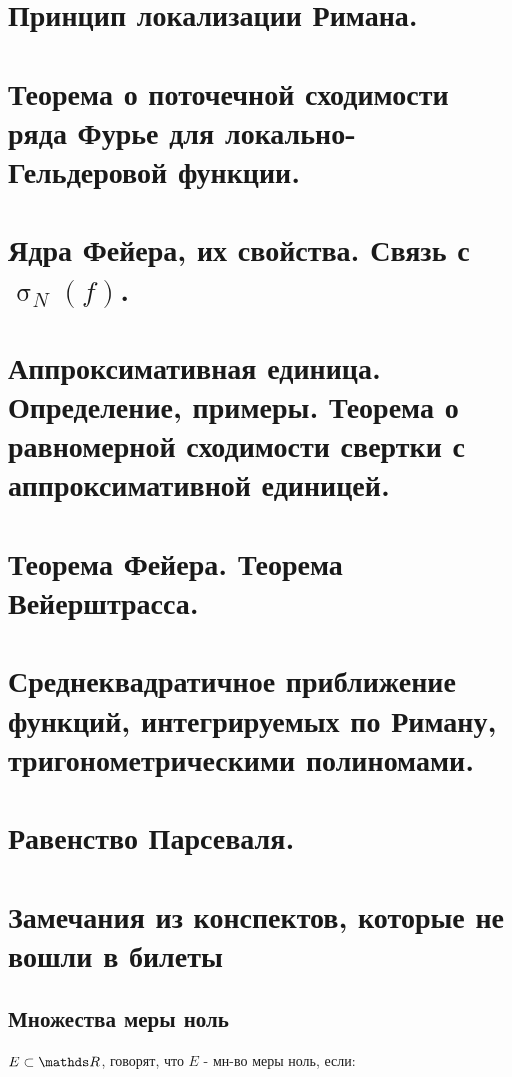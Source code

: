 \documentclass[11pt, fleqn]{article}
\begin{document}
\begin{Property}[3]
\begin{Property}[4]
\begin{Property}[2, аддитивность]
\begin{Proof}
\newpage
\section{Принцип локализации Римана.}


\newpage
\section{Теорема о поточечной сходимости ряда Фурье для локально-Гельдеровой функции.}


\newpage
\section{Ядра Фейера, их свойства. Связь с $\upsigma_N(f)$.}


\newpage
\section{Аппроксимативная единица. Определение, примеры. Теорема о равномерной сходимости свертки с аппроксимативной единицей.}


\newpage
\section{Теорема Фейера. Теорема Вейерштрасса.}


\newpage
\section{Среднеквадратичное приближение функций, интегрируемых по Риману, тригонометрическими полиномами.}


\newpage
\section{Равенство Парсеваля.}


\newpage
\section{Замечания из конспектов, которые не вошли в билеты}
\subsection{Множества меры ноль}

\begin{definition}
    $E \subset \R$, говорят, что $E$ - мн-во меры ноль, если:
    

\end{definition}
\end{Proof}
\end{Property}
\end{Property}
\end{Property}
\end{document}
